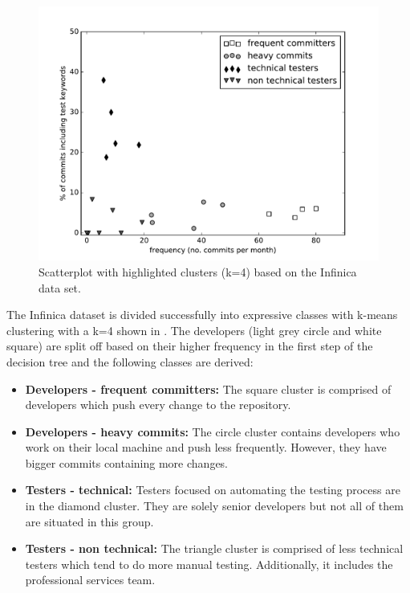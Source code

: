 \begin{figure}[h]
	\includegraphics[width=\columnwidth]{ResourceClassification/figures/infinica4k_black.pdf}
	\caption{Scatterplot with highlighted clusters (k=4) based on the Infinica data set.}
	\label{fig:infinica4k}
\end{figure}

The Infinica dataset is divided successfully into expressive classes with k-means clustering with a k=4 shown in . The developers (light grey circle and white square) are split off based on their higher frequency in the first step of the decision tree and the following classes are derived:

\begin{itemize}

\item \textbf{Developers - frequent committers:} The square cluster is comprised  of developers which push every change to the repository.

\item \textbf{Developers - heavy commits:} The circle cluster contains developers who work on their local machine and push less frequently. However, they have bigger commits containing more changes.

\item \textbf{Testers - technical:} Testers focused on automating the testing process are in the diamond cluster. They are solely senior developers but not all of them are situated in this group.

\item \textbf{Testers - non technical:} The triangle cluster is comprised of less technical testers which tend to do more manual testing. Additionally, it includes the professional services team.

\end{itemize}

